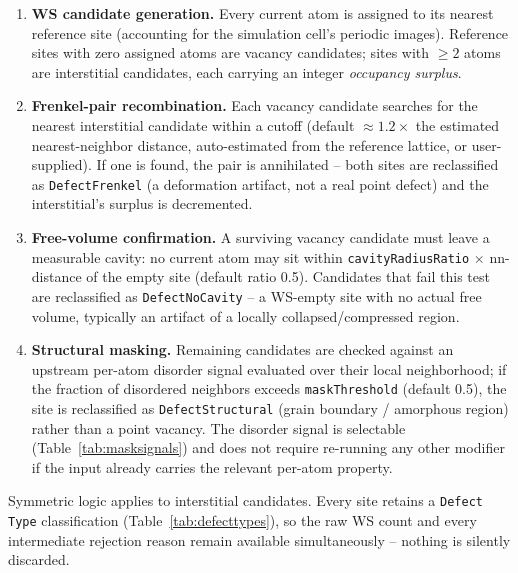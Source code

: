 \documentclass[11pt]{article}
\newcommand{\code}[1]{\texttt{#1}}
\newcommand{\attr}[1]{\texttt{#1}}
\begin{document}
\begin{enumerate}
    \item \textbf{WS candidate generation.} Every current atom is assigned to its nearest reference
    site (accounting for the simulation cell's periodic images). Reference sites with zero assigned
    atoms are vacancy candidates; sites with $\geq 2$ atoms are interstitial candidates, each
    carrying an integer \emph{occupancy surplus}.

    \item \textbf{Frenkel-pair recombination.} Each vacancy candidate searches for the nearest
    interstitial candidate within a cutoff (default $\approx 1.2\times$ the estimated
    nearest-neighbor distance, auto-estimated from the reference lattice, or user-supplied). If one
    is found, the pair is annihilated -- both sites are reclassified as \attr{DefectFrenkel} (a
    deformation artifact, not a real point defect) and the interstitial's surplus is decremented.

    \item \textbf{Free-volume confirmation.} A surviving vacancy candidate must leave a measurable
    cavity: no current atom may sit within \code{cavityRadiusRatio} $\times$ nn-distance of the
    empty site (default ratio \num{0.5}). Candidates that fail this test are reclassified as
    \attr{DefectNoCavity} -- a WS-empty site with no actual free volume, typically an artifact of a
    locally collapsed/compressed region.

    \item \textbf{Structural masking.} Remaining candidates are checked against an upstream
    per-atom disorder signal evaluated over their local neighborhood; if the fraction of disordered
    neighbors exceeds \code{maskThreshold} (default \num{0.5}), the site is reclassified as
    \attr{DefectStructural} (grain boundary / amorphous region) rather than a point vacancy. The
    disorder signal is selectable (Table~\ref{tab:masksignals}) and does not require re-running any
    other modifier if the input already carries the relevant per-atom property.
\end{enumerate}

Symmetric logic applies to interstitial candidates. Every site retains a \attr{Defect Type}
classification (Table~\ref{tab:defecttypes}), so the raw WS count and every intermediate rejection
reason remain available simultaneously -- nothing is silently discarded.
\end{document}
